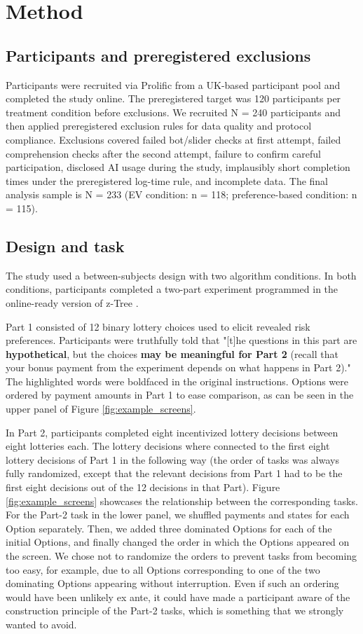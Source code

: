 \documentclass[a4paper, 12pt, fleqn]{article}
\theoremstyle{definition}
\begin{document}
\section{Method}
\label{sec:method}

\subsection{Participants and preregistered exclusions}
Participants were recruited via Prolific from a UK-based participant pool and completed the study online. The preregistered target was 120 participants per treatment condition before exclusions. We recruited N = 240 participants and then applied preregistered exclusion rules for data quality and protocol compliance. Exclusions covered failed bot/slider checks at first attempt, failed comprehension checks after the second attempt, failure to confirm careful participation, disclosed AI usage during the study, implausibly short completion times under the preregistered log-time rule, and incomplete data. The final analysis sample is N = 233 (EV condition: n = 118; preference-based condition: n = 115).

\subsection{Design and task}
The study used a between-subjects design with two algorithm conditions. In both conditions, participants completed a two-part experiment programmed in the online-ready version of z-Tree \citep{Fischbacher07}.

Part 1 consisted of 12 binary lottery choices used to elicit revealed risk preferences. Participants were truthfully told that "[t]he questions in this part are \textbf{hypothetical}, but the choices \textbf{may be meaningful for Part 2} (recall that your bonus payment from the experiment depends on what happens in Part 2)." The highlighted words were boldfaced in the original instructions. Options were ordered by payment amounts in Part 1 to ease comparison, as can be seen in the upper panel of Figure \ref{fig:example_screens}.

In Part 2, participants completed eight incentivized lottery decisions between eight lotteries each. The lottery decisions where connected to the first eight lottery decisions of Part 1 in the following way (the order of tasks was always fully randomized, except that the relevant decisions from Part 1 had to be the first eight decisions out of the 12 decisions in that Part). Figure \ref{fig:example_screens} showcases the relationship between the corresponding tasks. For the Part-2 task in the lower panel, we shuffled payments and states for each Option separately. Then, we
added three dominated Options for each of the initial Options, and finally changed the order in which the Options appeared on the screen. We chose not to randomize the orders to prevent tasks from becoming too easy, for example, due to all Options corresponding to one of the two dominating Options appearing without interruption. Even if such an ordering would have been unlikely ex ante, it could have made a participant aware of the construction principle of the Part-2 tasks, which is something that we strongly wanted to avoid.
\end{document}
